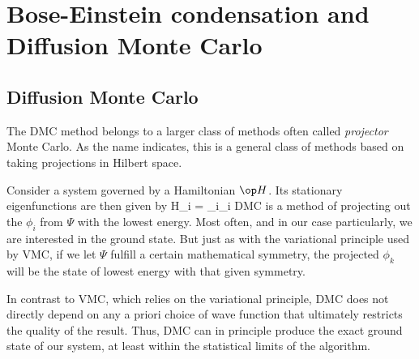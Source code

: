 \chapter{Bose-Einstein condensation and Diffusion Monte Carlo}\label{chap:advancedqmc}

\section{Diffusion Monte Carlo}

The DMC method belongs to a larger class of methods often called
\emph{projector} Monte Carlo. As the name indicates, this is a general
class of methods based on taking projections in Hilbert space.


Consider a system governed by a Hamiltonian $\op H$. Its stationary
eigenfunctions are then given by
\bdm
\op H\phi_i = \epsilon_i\phi_i
\edm
DMC is a method of projecting out the $\phi_i$ from $\Psi$ with the
lowest energy. Most often, and in our case particularly, we are
interested in the ground state. But just as with the variational
principle used by VMC, if we let $\Psi$ fulfill a certain mathematical
symmetry, the projected $\phi_k$ will be the state of lowest energy
with that given symmetry.

In contrast to VMC, which relies on the variational principle, DMC does not directly depend on any a
priori choice of wave function that ultimately restricts the quality
of the result. Thus, DMC can in principle produce the exact ground
state of our system, at least within the statistical limits of the
algorithm.


